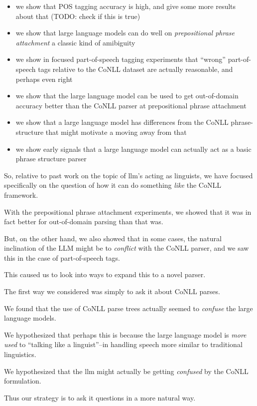 \begin{itemize}
    \item we show that POS tagging accuracy is high, and give some more results about that (TODO: check if this is true)
    \item we show that large language models can do well on {\em prepositional phrase attachment} a classic kind of amibiguity
    \item we show in focused part-of-speech tagging experiments that ``wrong'' part-of-speech tags relative to the CoNLL dataset are actually reasonable, and perhaps even right
    \item we show that the large language model can be used to get out-of-domain accuracy better than the CoNLL parser at prepositional phrase attachment
    \item we show that a large language model has differences from the CoNLL phrase-structure that might motivate a moving away from that
    \item we show early signals that a large language model can actually act as a basic phrase structure parser
\end{itemize}

So, relative to past work on the topic of llm's acting as linguists, we have focused specifically on the question of how it can do something {\em like} the CoNLL framework.

With the prepositional phrase attachment experiments, we showed that it was in fact better for out-of-domain parsing than that was.

But, on the other hand, we also showed that in some cases, the natural inclination of the LLM might be to {\em conflict} with the CoNLL parser, and we saw this in the case of part-of-speech tags.

This caused us to look into ways to expand this to a novel parser.

The first way we considered was simply to ask it about CoNLL parses.

We found that the use of CoNLL parse trees actually seemed to {\em confuse} the large language models.

We hypothesized that perhaps this is because the large language model is {\em more used} to ``talking like a linguist''--in handling speech more similar to traditional linguistics.

We hypothesized that the llm might actually be getting {\em confused} by the CoNLL formulation.

Thus our strategy is to ask it questions in a more natural way.